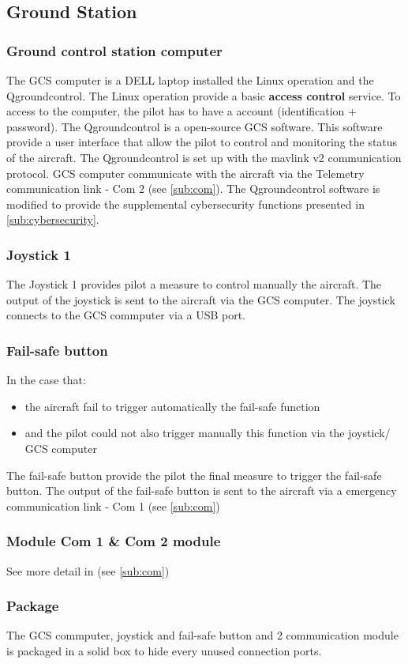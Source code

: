 \documentclass[]{article}
\begin{document}
\subsection{Ground Station}
\subsubsection{Ground control station computer}
The GCS computer is a DELL laptop installed the Linux operation and the Qgroundcontrol. The Linux operation provide a basic \textbf{access control} service. To access to the computer, the pilot has to have a account (identification + password). The Qgroundcontrol is a open-source GCS software. This software provide a user interface that allow the pilot to control and monitoring the status of the aircraft. The Qgroundcontrol is set up with the mavlink v2 communication protocol. GCS computer communicate with the aircraft via the Telemetry communication link - Com 2 (see \ref{sub:com}). The Qgroundcontrol software is modified to provide the supplemental cybersecurity functions presented in \ref{sub:cybersecurity}.
\subsubsection{Joystick 1}
The Joystick 1 provides pilot a measure to control manually the aircraft. The output of the joystick is sent to the aircraft via the GCS computer. The joystick connects to the GCS commputer via a USB port.
\subsubsection{Fail-safe button}
In the case that:
\begin{itemize}
	\item the aircraft fail to trigger automatically the fail-safe function 
	\item and the pilot could not also trigger manually this function via the joystick/ GCS computer    
\end{itemize}
The fail-safe button provide the pilot the final measure to trigger the fail-safe button. The output of the fail-safe button is sent to the aircraft via a emergency communication link - Com 1 (see \ref{sub:com})

\subsubsection{Module Com 1 \& Com 2 module}
See more detail in (see \ref{sub:com})
\subsubsection{Package}
The GCS commputer, joystick and fail-safe button and 2 communication module is packaged in a solid box to hide every unused connection ports.
\end{document}
